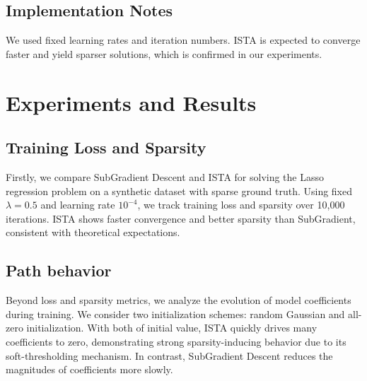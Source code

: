 \documentclass[11pt]{article}
\begin{document}
\subsection*{Implementation Notes}
We used fixed learning rates and iteration numbers. ISTA is expected to converge faster and yield sparser solutions, which is confirmed in our experiments.
\section{Experiments and Results}

\subsection{Training Loss and Sparsity}
Firstly, we compare SubGradient Descent and ISTA for solving the Lasso regression problem on a synthetic dataset with sparse ground truth. Using fixed \( \lambda = 0.5 \) and learning rate \( 10^{-4} \), we track training loss and sparsity over 10{,}000 iterations. ISTA shows faster convergence and better sparsity than SubGradient, consistent with theoretical expectations.

\subsection{Path behavior}
Beyond loss and sparsity metrics, we analyze the evolution of model coefficients during training.
We consider two initialization schemes: random Gaussian and all-zero initialization. With both of initial value, ISTA quickly drives many coefficients to zero, demonstrating strong sparsity-inducing behavior due to its soft-thresholding mechanism. In contrast, SubGradient Descent reduces the magnitudes of coefficients more slowly.
\end{document}
